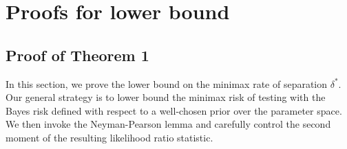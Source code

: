 \documentclass{article}
\begin{document}
\printbibliography


\newpage 

\appendix

\section{Proofs for lower bound}

\subsection{Proof of Theorem 1}

In this section, we prove the lower bound on the minimax rate of separation $\delta^*$. Our general strategy is to lower bound the minimax risk of testing with the Bayes risk defined with respect to a well-chosen prior over the parameter space. We then invoke the Neyman-Pearson lemma and carefully control the second moment of the resulting likelihood ratio statistic. 
\end{document}
